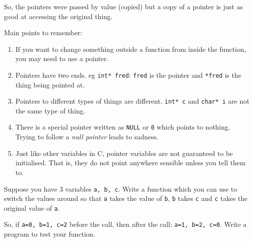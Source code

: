 So, the pointers were passed by value (copied) but a copy of a pointer is just as good at accessing the original thing.

Main points to remember:
\begin{enumerate}
 \item If you want to change something outside a function from inside the function, you may need to use a pointer.
 \item Pointers have two ends. eg \lstinline!int* fred!:   \texttt{fred} is the pointer and \texttt{*fred} is the thing 
 being pointed at.
 \item Pointers to different types of things are different. \lstinline!int* c! and \lstinline!char* i! are not the same type of thing.
 \item There is a special pointer written as \texttt{NULL} or \texttt{0} which points to nothing.
 Trying to follow a \emph{null pointer} leads to sadness.
 \item Just like other variables in C, pointer variables are not guaranteed to be initialised.
 That is, they do not point anywhere sensible unless you tell them to.
\end{enumerate}

\begin{exercise}
Suppose you have 3 variables \texttt{a, b, c}.
Write a function which you can use to switch the values around so that 
\texttt{a} takes the value of \texttt{b}, \texttt{b} takes \texttt{c}
and \texttt{c} takes the original value of \texttt{a}.

So, if \lstinline{a=0, b=1, c=2} before the call, then after the call:
\lstinline{a=1, b=2, c=0}.
Write a program to test your function. 
\end{exercise}




